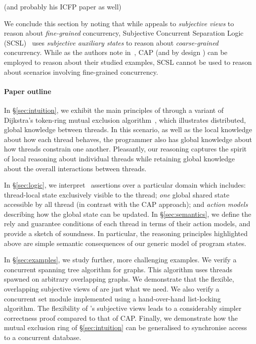 (and probably his ICFP paper as well)

We conclude this section by noting that while \colosl appeals to \emph{subjective views} to reason about \emph{fine-grained} concurrency, Subjective Concurrent Separation Logic (SCSL)~\cite{SCSL} uses \emph{subjective auxiliary states} to reason about \emph{coarse-grained} concurrency. While as the authors note in~\cite{SCSL}, CAP (and by
design \colosl) can be employed to reason about their studied examples, SCSL cannot be used to reason about scenarios involving fine-grained concurrency.

\paragraph{Paper outline}
In \S\ref{sec:intuition}, we exhibit the main principles of \colosl
through a variant of Dijkstra's token-ring mutual exclusion
algorithm~\cite{dijkstra74}, which illustrates distributed, global
knowledge between threads. In this scenario, as well as the local
knowledge about how each thread behaves, the programmer also has
global knowledge about how threads constrain one another. Pleasantly,
our reasoning captures the spirit of local reasoning about individual
threads while retaining global knowledge about the overall
interactions between threads.

\todo In \S\ref{sec:logic}, we interpret \colosl\ assertions over a particular domain which includes: thread-local state exclusively visible to the thread; {\em one} global shared state accessible by all thread (in contrast with the CAP approach); and {\em action models} describing how the global state can be updated. In \S\ref{sec:semantics}, we define the rely and guarantee conditions of each thread in terms of their action models, and provide a sketch of soundness. In particular, the reasoning principles highlighted above are simple semantic
consequences of our generic model of program states.  

In \S\ref{sec:examples}, we study further, more challenging examples. We verify a concurrent spanning tree algorithm for graphs. This algorithm uses threads spawned on arbitrary overlapping graphs. We demonstrate that the flexible, overlapping subjective views of \colosl are just what we need.  We also verify a concurrent set module implemented using a hand-over-hand list-locking algorithm.
%
The flexibility of \colosl's subjective views leads to a considerably simpler correctness proof compared to that of CAP. 
%
Finally, we demonstrate how the mutual exclusion ring of \S\ref{sec:intuition} can be generalised to synchronise access to a concurrent database.
